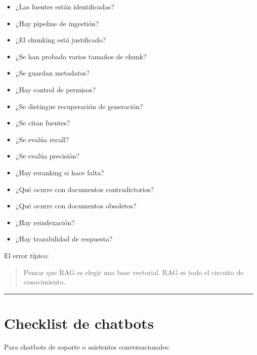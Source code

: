 \begin{itemize}
\tightlist
\item
  ¿Las fuentes están identificadas?
\item
  ¿Hay pipeline de ingestión?
\item
  ¿El chunking está justificado?
\item
  ¿Se han probado varios tamaños de chunk?
\item
  ¿Se guardan metadatos?
\item
  ¿Hay control de permisos?
\item
  ¿Se distingue recuperación de generación?
\item
  ¿Se citan fuentes?
\item
  ¿Se evalúa recall?
\item
  ¿Se evalúa precisión?
\item
  ¿Hay reranking si hace falta?
\item
  ¿Qué ocurre con documentos contradictorios?
\item
  ¿Qué ocurre con documentos obsoletos?
\item
  ¿Hay reindexación?
\item
  ¿Hay trazabilidad de respuesta?
\end{itemize}

El error típico:

\begin{quote}
Pensar que RAG es elegir una base vectorial. RAG es todo el circuito de
conocimiento.
\end{quote}

\begin{center}\rule{0.5\linewidth}{0.5pt}\end{center}

\section{Checklist de chatbots}\label{checklist-de-chatbots}

Para chatbots de soporte o asistentes conversacionales:

